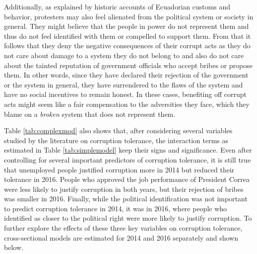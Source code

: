 \documentclass[floatsintext,man]{apa7}\usepackage[]{graphicx}\usepackage[]{color}
\begin{document}
Additionally, as explained by historic accounts of Ecuadorian customs and behavior, protesters may also feel alienated from the political system or society in general. They might believe that the people in power do not represent them and thus do not feel identified with them or compelled to support them. From that it follows that they deny the negative consequences of their corrupt acts as they do not care about damage to a system they do not belong to and also do not care about the tainted reputation of government officials who accept bribes or propose them. In other words, since they have declared their rejection of the government or the system in general, they have surrendered to the flaws of the system and have no social incentives to remain honest. In these cases, benefiting off corrupt acts might seem like a fair compensation to the adversities they face, which they blame on a \textit{broken} system that does not represent them.

Table \ref{tab:complexmod} also shows that, after considering several variables studied by the literature on corruption tolerance, the interaction terms as estimated in Table \ref{tab:simplemodel} keep their signs and significance. Even after controlling for several important predictors of corruption tolerance, it is still true that unemployed people justified corruption more in 2014 but reduced their tolerance in 2016. People who approved the job performance of President Correa were less likely to justify corruption in both years, but their rejection of bribes was smaller in 2016. Finally, while the political identification was not important to predict corruption tolerance in 2014, it was in 2016, where people who identified as closer to the political right were more likely to justify corruption. To further explore the effects of these three key variables on corruption tolerance, cross-sectional models are estimated for 2014 and 2016 separately and shown below.


\renewcommand{\arraystretch}{0.6}
\end{document}
